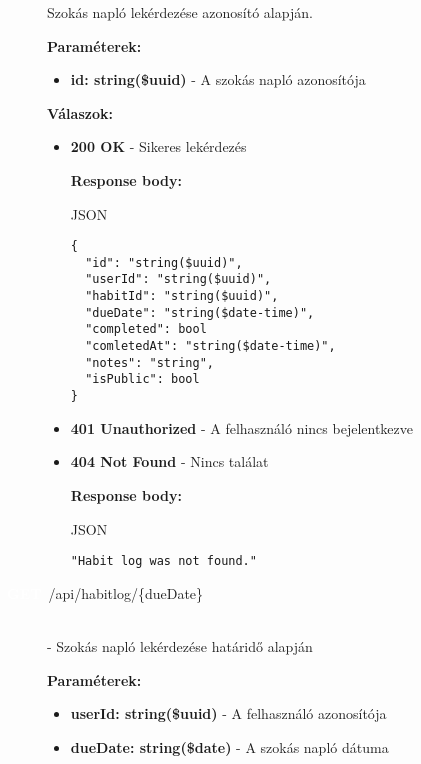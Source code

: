 \documentclass[12pt]{report}
\newcommand{\httpGet}[1]{\colorbox{getColor}{\textbf{\textcolor{white}{GET}}}~#1}
\begin{document}
\begin{description}
    \vspace{0.5cm}
    Szokás napló lekérdezése azonosító alapján.

    \vspace{0.5cm}
    \textbf{Paraméterek:}
    \begin{itemize}
      \item \textbf{id: string(\$uuid)} - A szokás napló azonosítója
    \end{itemize}

    \vspace{0.5cm}
    \textbf{Válaszok:}
    \begin{itemize}
      \item \textbf{200 OK} - Sikeres lekérdezés

        \textbf{Response body:}
        \begin{codeblock}{JSON}
          \begin{verbatim}
{
  "id": "string($uuid)",
  "userId": "string($uuid)",
  "habitId": "string($uuid)",
  "dueDate": "string($date-time)",
  "completed": bool
  "comletedAt": "string($date-time)",
  "notes": "string",
  "isPublic": bool
}
          \end{verbatim}
        \end{codeblock}

      \item \textbf{401 Unauthorized} - A felhasználó nincs bejelentkezve

      \item \textbf{404 Not Found} - Nincs találat

        \textbf{Response body:}
        \begin{codeblock}{JSON}
          \begin{verbatim}
"Habit log was not found."
          \end{verbatim}
        \end{codeblock}
    \end{itemize}

  \item[\httpGet{/api/habitlog/\{dueDate\}}] 
  \hfill \\ - Szokás napló lekérdezése határidő alapján
  
    \vspace{0.5cm}
    \textbf{Paraméterek:}
    \begin{itemize}
      \item \textbf{userId: string(\$uuid)} - A felhasználó azonosítója
      \item \textbf{dueDate: string(\$date)} - A szokás napló dátuma
    \end{itemize}


\end{description}
\end{document}
